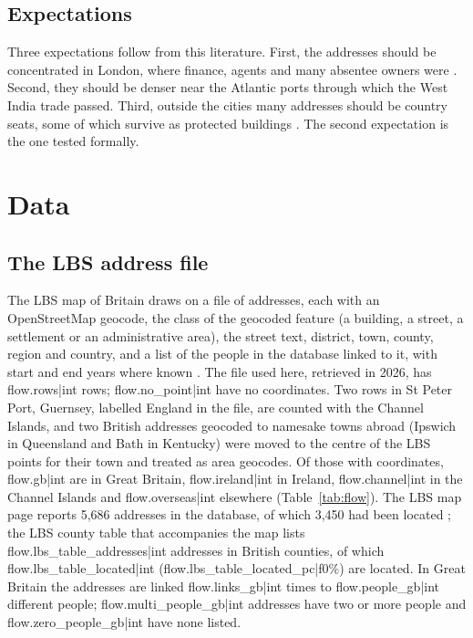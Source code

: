 \documentclass[11pt,a4paper]{article}
\begin{document}
\subsection{Expectations}
Three expectations follow from this literature. First, the addresses should be concentrated in London, where finance, agents and many absentee owners were \citep{draper2010}. Second, they should be denser near the Atlantic ports through which the West India trade passed. Third, outside the cities many addresses should be country seats, some of which survive as protected buildings \citep{dresser2013}. The second expectation is the one tested formally.

\section{Data}\label{sec:data}
\subsection{The LBS address file}
The LBS map of Britain draws on a file of addresses, each with an OpenStreetMap geocode, the class of the geocoded feature (a building, a street, a settlement or an administrative area), the street text, district, town, county, region and country, and a list of the people in the database linked to it, with start and end years where known \citep{lbs2026maps}. The file used here, retrieved in 2026, has {{flow.rows|int}} rows; {{flow.no_point|int}} have no coordinates. Two rows in St Peter Port, Guernsey, labelled England in the file, are counted with the Channel Islands, and two British addresses geocoded to namesake towns abroad (Ipswich in Queensland and Bath in Kentucky) were moved to the centre of the LBS points for their town and treated as area geocodes. Of those with coordinates, {{flow.gb|int}} are in Great Britain, {{flow.ireland|int}} in Ireland, {{flow.channel|int}} in the Channel Islands and {{flow.overseas|int}} elsewhere (Table~\ref{tab:flow}). The LBS map page reports 5,686 addresses in the database, of which 3,450 had been located \citep{lbs2026maps}; the LBS county table that accompanies the map lists {{flow.lbs_table_addresses|int}} addresses in British counties, of which {{flow.lbs_table_located|int}} ({{flow.lbs_table_located_pc|f0}}\%) are located. In Great Britain the addresses are linked {{flow.links_gb|int}} times to {{flow.people_gb|int}} different people; {{flow.multi_people_gb|int}} addresses have two or more people and {{flow.zero_people_gb|int}} have none listed.
\end{document}
